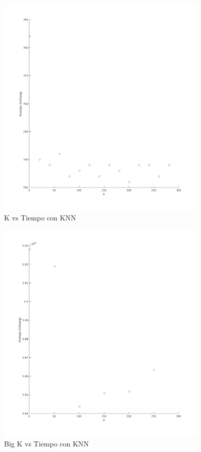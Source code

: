 \begin{figure}[H]
	\centering	\includegraphics[width=0.9\textwidth]{img/k_knn_tiempo.png}
	\caption{K vs Tiempo con KNN}
	\label{fig:K vs Tiempo con KNN}
\end{figure}
\begin{figure}[H]
	\centering	\includegraphics[width=0.9\textwidth]{img/big_k_knn_tiempo.png}
	\caption{Big K vs Tiempo con KNN}
	\label{fig:Big K vs Tiempo con KNN}
\end{figure}





